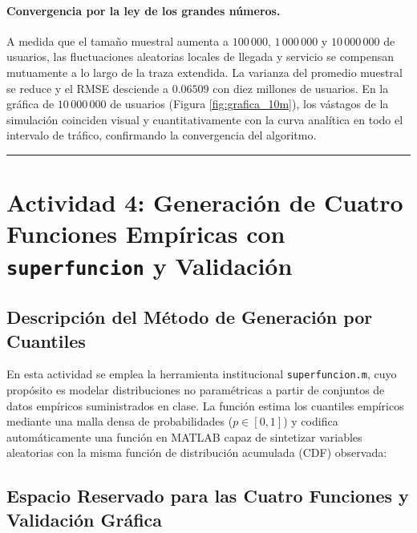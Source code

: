 \documentclass[11pt, a4paper]{article}
\begin{document}
\paragraph{Convergencia por la ley de los grandes números.}
A medida que el tamaño muestral aumenta a $100\,000$, $1\,000\,000$ y $10\,000\,000$ de usuarios, las fluctuaciones aleatorias locales de llegada y servicio se compensan mutuamente a lo largo de la traza extendida. La varianza del promedio muestral se reduce y el RMSE desciende a $0.06509$ con diez millones de usuarios. En la gráfica de $10\,000\,000$ de usuarios (Figura \ref{fig:grafica_10m}), los vástagos de la simulación coinciden visual y cuantitativamente con la curva analítica en todo el intervalo de tráfico, confirmando la convergencia del algoritmo.

\vspace{1em}
\hrule
\vspace{1em}

\section{Actividad 4: Generación de Cuatro Funciones Empíricas con \texttt{superfuncion} y Validación}

\subsection{Descripción del Método de Generación por Cuantiles}
En esta actividad se emplea la herramienta institucional \texttt{superfuncion.m}, cuyo propósito es modelar distribuciones no paramétricas a partir de conjuntos de datos empíricos suministrados en clase. La función estima los cuantiles empíricos mediante una malla densa de probabilidades ($p \in [0, 1]$) y codifica automáticamente una función en MATLAB capaz de sintetizar variables aleatorias con la misma función de distribución acumulada (CDF) observada:



\subsection{Espacio Reservado para las Cuatro Funciones y Validación Gráfica}
\end{document}
